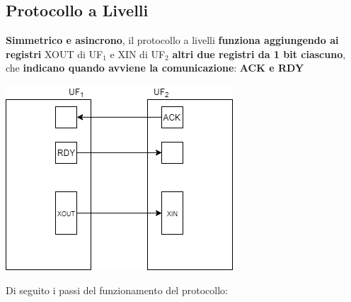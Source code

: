 \documentclass[10pt]{report}
\begin{document}
\subsection{Protocollo a Livelli}
\textbf{Simmetrico e asincrono}, il protocollo a livelli \textbf{funziona aggiungendo ai registri} XOUT di UF$_1$ e XIN di UF$_2$ \textbf{altri due registri da 1 bit ciascuno}, che \textbf{indicano quando avviene la comunicazione}: \textbf{ACK e RDY}
\begin{center}
\includegraphics[scale=0.7]{ufprotliv.png}
\end{center}
Di seguito i passi del funzionamento del protocollo:
\end{document}
